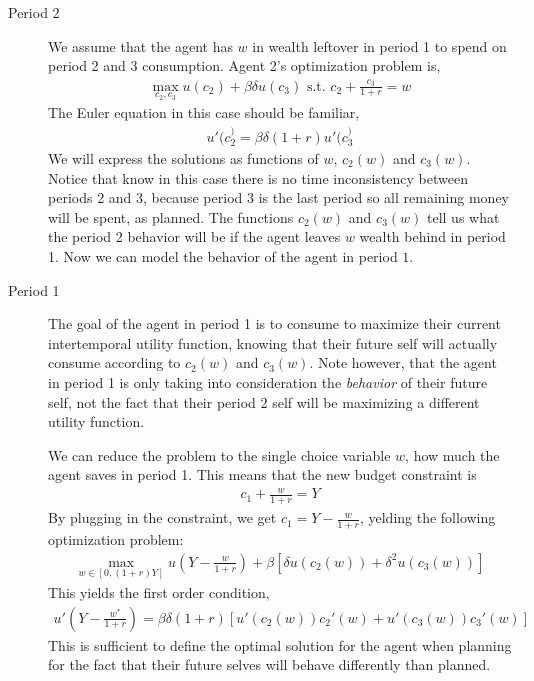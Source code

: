 \begin{description}
    \item[Period 2] We assume that the agent has $w$ in wealth leftover in period 1 to spend on period 2 and 3 consumption. Agent 2's optimization problem is,
    \begin{align*}
        \max_{c_2, c_3} u(c_2) + \beta \delta u(c_3) \text{ s.t. } c_2 + \frac{c_3}{1 + r} = w
    \end{align*} 
    The Euler equation in this case should be familiar,
    \begin{align*}
        u'(c_2^) = \beta \delta (1 + r) u'(c_3^)
    \end{align*}
    We will express the solutions as functions of $w$, $c_2(w)$ and $c_3(w)$. Notice that know in this case there is no time inconsistency between periods 2 and 3, because period 3 is the last period so all remaining money will be spent, as planned. The functions $c_2(w)$ and $c_3(w)$ tell us what the period 2 behavior will be if the agent leaves $w$ wealth behind in period 1. Now we can model the behavior of the agent in period $1$. 
    \item[Period 1] The goal of the agent in period 1 is to consume to maximize their current intertemporal utility function, knowing that their future self will actually consume according to $c_2(w)$ and $c_3(w)$. Note however, that the agent in period 1 is only taking into consideration the \emph{behavior} of their future self, not the fact that their period 2 self will be maximizing a different utility function. 
    
    We can reduce the problem to the single choice variable $w$, how much the agent saves in period 1. This means that the new budget constraint is
    \begin{align*}
        c_1 + \frac{w}{1 + r} = Y
    \end{align*}
    By plugging in the constraint, we get $c_1 = Y - \frac{w}{1 + r}$, yelding the following optimization problem:
    \begin{align*}
        \max_{w \in [0, (1 + r) Y]} u\left(Y - \frac{w}{1 + r}\right) + \beta[\delta u(c_2(w)) + \delta^2 u(c_3(w))]
    \end{align*}
    This yields the first order condition,
    \begin{align*}
        u'\left(Y - \frac{w^*}{1 + r}\right) = \beta \delta (1 + r) \left[u'(c_2(w))c_2'(w) + u'(c_3(w))c_3'(w)\right] 
    \end{align*}
    This is sufficient to define the optimal solution for the agent when planning for the fact that their future selves will behave differently than planned. 
\end{description}

